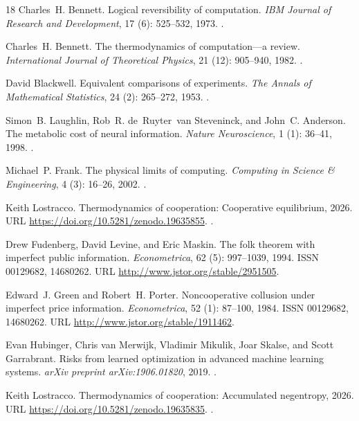 \documentclass[11pt]{article}
\theoremstyle{plain}
\theoremstyle{definition}
\theoremstyle{remark}
\begin{document}
\begin{thebibliography}{18}
Charles~H. Bennett.
\newblock Logical reversibility of computation.
\newblock \emph{IBM Journal of Research and Development}, 17
  (6): 525--532, 1973.
\newblock {}.

Charles~H. Bennett.
\newblock The thermodynamics of computation---a review.
\newblock \emph{International Journal of Theoretical Physics}, 21
  (12): 905--940, 1982.
\newblock {}.

David Blackwell.
\newblock Equivalent comparisons of experiments.
\newblock \emph{The Annals of Mathematical Statistics}, 24
  (2): 265--272, 1953.
\newblock {}.

Simon~B. Laughlin, Rob~R. de~Ruyter~van Steveninck, and John~C. Anderson.
\newblock The metabolic cost of neural information.
\newblock \emph{Nature Neuroscience}, 1 (1): 36--41, 1998.
\newblock {}.

Michael~P. Frank.
\newblock The physical limits of computing.
\newblock \emph{Computing in Science \& Engineering}, 4 (3):
  16--26, 2002.
\newblock {}.

Keith Lostracco.
\newblock Thermodynamics of cooperation: Cooperative equilibrium,
  2026{}.
\newblock URL \url{https://doi.org/10.5281/zenodo.19635855}.
\newblock {}.

Drew Fudenberg, David Levine, and Eric Maskin.
\newblock The folk theorem with imperfect public information.
\newblock \emph{Econometrica}, 62 (5): 997--1039, 1994.
\newblock ISSN 00129682, 14680262.
\newblock URL \url{http://www.jstor.org/stable/2951505}.

Edward~J. Green and Robert~H. Porter.
\newblock Noncooperative collusion under imperfect price information.
\newblock \emph{Econometrica}, 52 (1): 87--100, 1984.
\newblock ISSN 00129682, 14680262.
\newblock URL \url{http://www.jstor.org/stable/1911462}.

Evan Hubinger, Chris van Merwijk, Vladimir Mikulik, Joar Skalse, and Scott
  Garrabrant.
\newblock Risks from learned optimization in advanced machine learning systems.
\newblock \emph{arXiv preprint arXiv:1906.01820}, 2019.
\newblock {}.

Keith Lostracco.
\newblock Thermodynamics of cooperation: Accumulated negentropy,
  2026{}.
\newblock URL \url{https://doi.org/10.5281/zenodo.19635835}.
\newblock {}.

\end{thebibliography}
\end{document}
